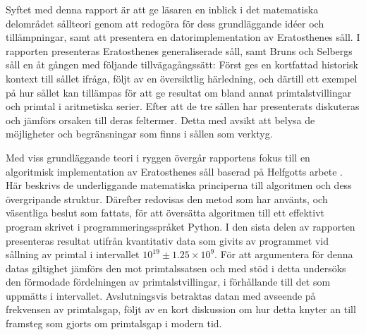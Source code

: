 Syftet med denna rapport är att ge läsaren en inblick i det matematiska delområdet sållteori genom att redogöra för dess grundläggande idéer och tillämpningar,
samt att presentera en datorimplementation av Eratosthenes såll.
%
I rapporten presenteras Eratosthenes generaliserade såll,
samt Bruns och Selbergs såll en åt gången med följande tillvägagångssätt:
Först ges en kortfattad historisk kontext till sållet ifråga,
följt av en översiktlig härledning,
och därtill ett exempel på hur sållet kan tillämpas
för att ge resultat om bland annat primtalstvillingar och primtal i aritmetiska serier.
%
Efter att de tre sållen har presenterats diskuteras och jämförs orsaken till deras feltermer.
Detta med avsikt att belysa de möjligheter och begränsningar som finns i sållen som verktyg.
%

%
Med viss grundläggande teori i ryggen  %
övergår rapportens fokus till en algoritmisk implementation av Eratosthenes såll baserad på Helfgotts arbete \cite{HaraldSieve}.
%
Här beskrivs de underliggande matematiska principerna till algoritmen och dess övergripande struktur. 
Därefter redovisas den metod som har använts, och väsentliga beslut som fattats,
för att översätta algoritmen till ett effektivt program skrivet i programmeringsspråket Python.
%
I den sista delen av rapporten presenteras resultat utifrån kvantitativ data som givits av programmet vid sållning av primtal i intervallet \(10^{19}\pm 1.25\times10^9\).
För att argumentera för denna datas giltighet jämförs den mot primtalssatsen och med stöd i detta undersöks den förmodade fördelningen av primtalstvillingar, i förhållande till det som uppmätts i intervallet.
Avslutningsvis betraktas datan med avseende på frekvensen av primtalsgap, följt av en kort diskussion om hur detta knyter an till framsteg som gjorts om primtalsgap i modern tid.


 


  



